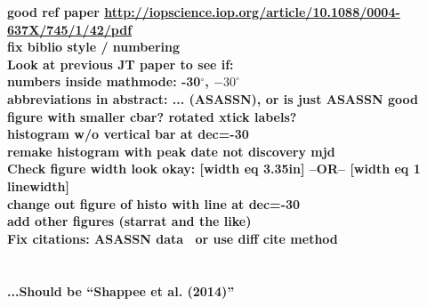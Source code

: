 
{\bf good ref paper \url{http://iopscience.iop.org/article/10.1088/0004-637X/745/1/42/pdf}}\\
{\bf fix biblio style / numbering}\\
{\bf Look at previous JT paper to see if:\\
numbers inside mathmode: -30$^{\circ}$, $-30^{\circ}$\\
abbreviations in abstract: ... (ASASSN), or is just ASASSN good\\
}
{\bf figure with smaller cbar? rotated xtick labels?}\\
{\bf histogram w/o vertical bar at dec=-30\deg}\\
{\bf remake histogram with peak date not discovery mjd}\\
{\bf Check figure width look okay: [width eq 3.35in] --OR-- [width eq 1 linewidth]}\\


{\bf change out figure of histo with line at dec=-30}\\
{\bf add other figures (starrat and the like)}\\



{\bf Fix citations: ASASSN data~\cite{asn_data} or use diff cite method\\
\citet{asn_data}\\
\citealt{asn_data}\\
...Should be ``Shappee et al. (2014)''
}